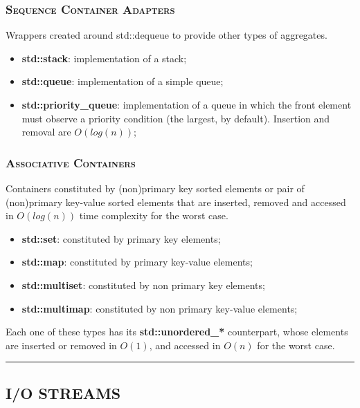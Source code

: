 \documentclass[10pt]{article}
\begin{document}
\begin{multicols*}{5}
{\subsubsection*{\textsc{Sequence Container Adapters}} 
\noindent
Wrappers created around std::dequeue to provide other types of aggregates.

\begin{itemize}[leftmargin=*,topsep=0.25pt]
  \setlength\itemsep{.3pt}
	\item \textbf{std::stack}: implementation of a stack;
	\item \textbf{std::queue}: implementation of a simple queue;
	\item \textbf{std::priority\_queue}: implementation of a queue in which the front element must observe a priority condition (the largest, by default). Insertion and removal are $O(log(n))$;
\end{itemize}
\noindent

\subsubsection*{\textsc{Associative Containers}} 
\noindent
Containers constituted by (non)primary key sorted elements or pair of (non)primary key-value sorted elements that are  inserted, removed and accessed in $O(log(n))$ time complexity for the worst case.

\begin{itemize}[leftmargin=*,topsep=0.25pt]
  \setlength\itemsep{.3pt}
	\item \textbf{std::set}: constituted by primary key elements;
	\item \textbf{std::map}: constituted by primary key-value elements;
	\item \textbf{std::multiset}: constituted by non primary key elements;
	\item \textbf{std::multimap}: constituted by non primary key-value elements;  
\end{itemize}
\noindent
Each one of these types has its \textbf{std::unordered\_*} counterpart, whose elements are inserted or removed in $O(1)$, and accessed in $O(n)$ for the worst case. 


}

\par\noindent\rule{155pt}{0.4pt}

{\color{Blue}
\subsection*{I/O STREAMS}	
\blindtext

}
\end{multicols*}
\end{document}
